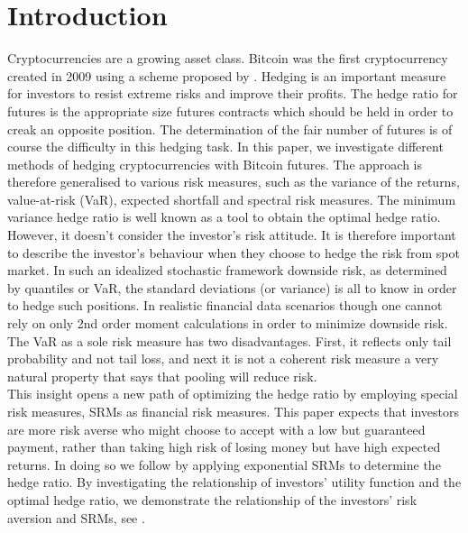 \documentclass[11pt,a4paper,english]{article}
\begin{document}
\section{Introduction}

Cryptocurrencies are a growing asset class. Bitcoin was the first cryptocurrency created in 2009 using a scheme proposed by {\color{blue}\citet{nakamoto2019bitcoin}}. Hedging is an important measure for investors to resist extreme risks and improve their profits. The hedge ratio for futures is the appropriate size futures contracts which should be held in order to creak an opposite position. The determination of the fair number of futures is of course the difficulty in this hedging task. In this paper, we investigate different methods of hedging cryptocurrencies with Bitcoin futures. The approach is therefore generalised to various risk measures, such as the variance of the returns, value-at-risk (VaR), expected shortfall and spectral risk measures. The minimum variance hedge ratio is well known as a tool to obtain the optimal hedge ratio. However, it doesn't consider the investor's risk attitude. It is therefore important to describe the investor's behaviour when they choose to hedge the risk from spot market. In such an idealized stochastic framework downside risk, as determined by quantiles or VaR, the standard deviations (or variance) is all to know in order to hedge such positions.  In realistic financial data scenarios though one cannot rely on only 2nd order moment calculations in order to minimize downside risk.  The VaR as a sole risk measure has two disadvantages.  First, it reflects only tail probability and not tail loss, and next it is not a coherent risk measure a very natural property that says that pooling will reduce risk. \\


This insight opens a new path of optimizing the hedge ratio by employing special risk measures, SRMs as financial risk measures. This paper expects that investors are more risk averse who might choose to accept with a low but guaranteed payment, rather than taking high risk of losing money but have high expected returns. In doing so we follow {\color{blue}\citet{barbi2014copula}} by applying exponential SRMs to determine the hedge ratio.  By investigating the relationship of investors' utility function and the optimal hedge ratio, we demonstrate the relationship of the investors' risk aversion and SRMs, see {\color{blue}\citet{brandtner2015decision}}.\\
\end{document}
